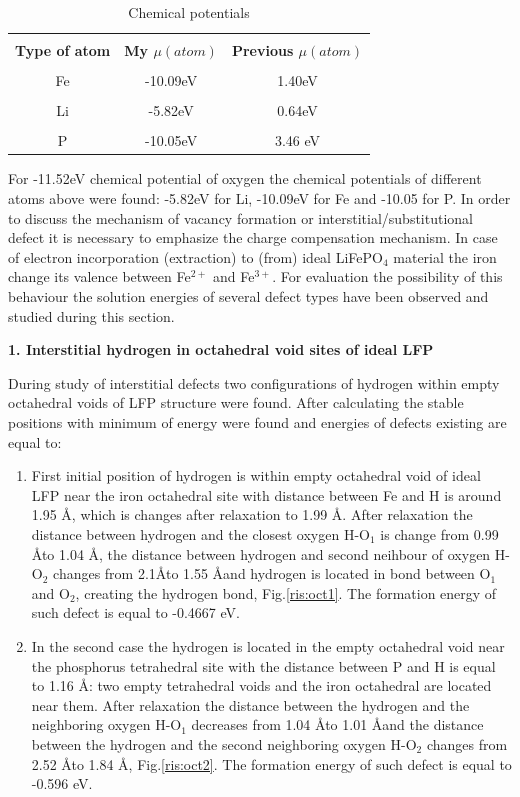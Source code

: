 \begin{table}[h]
\caption{Chemical potentials}
\label{tabular:LiFeP}
\begin{center}
\begin{tabular}{|c|c|c|}
\hline
& &  \\
\textbf{Type of atom} & \textbf{My $\mu(atom)$} & \textbf{Previous $\mu(atom)$}  \\
\hline
& &  \\
Fe & -10.09eV & 1.40eV \\ 
\hline
& &  \\
Li &  -5.82eV  &  0.64eV \\ 
\hline
& &  \\
P &  -10.05eV & 3.46 eV \\ 
\hline
\end{tabular}
\end{center}
\end{table}

For -11.52eV chemical potential of oxygen the chemical potentials of different atoms above were found: -5.82eV for Li, -10.09eV for Fe and -10.05 for P. In order to discuss the mechanism of vacancy formation or interstitial/substitutional defect it is necessary to emphasize the charge compensation mechanism. In case of electron incorporation (extraction) to (from) ideal LiFePO$_4$ material the iron change its valence between Fe$^{2+}$ and Fe$^{3+}$. For evaluation the possibility of this behaviour the solution energies of several defect types have been observed and studied during this section.

\textbf{1. Interstitial hydrogen in octahedral void sites of ideal LFP}

During study of interstitial defects two configurations of hydrogen within empty octahedral voids of LFP structure were found.  After calculating the stable positions with minimum of energy were found and energies of defects existing are equal to:
\begin{enumerate}
	\item First initial position of hydrogen is within empty octahedral void of ideal LFP near the iron octahedral site with distance between Fe and H is around 1.95 \AA, which is changes after relaxation to 1.99 \AA. After relaxation the distance between hydrogen and the closest oxygen H-O$_1$ is change from 0.99 \AA to 1.04 \AA, the distance between hydrogen and second neihbour of oxygen H-O$_2$ changes from 2.1\AA to 1.55 \AA and hydrogen is located in bond between O$_1$ and O$_2$, creating the hydrogen bond, Fig.\ref{ris:oct1}. The formation energy of such defect is equal to -0.4667 eV.
	\item In the second case the hydrogen is located in the empty octahedral void near the phosphorus tetrahedral site with the distance between P and H is equal to 1.16 \AA: two empty tetrahedral voids and the iron octahedral are located near them. After relaxation the distance between the hydrogen and the neighboring oxygen H-O$_1$ decreases from 1.04 \AA to 1.01 \AA and the distance between the hydrogen and the second neighboring oxygen H-O$_2$ changes from 2.52 \AA to 1.84 \AA, Fig.\ref{ris:oct2}. The formation energy of such defect is equal to -0.596 eV.
\end{enumerate}

